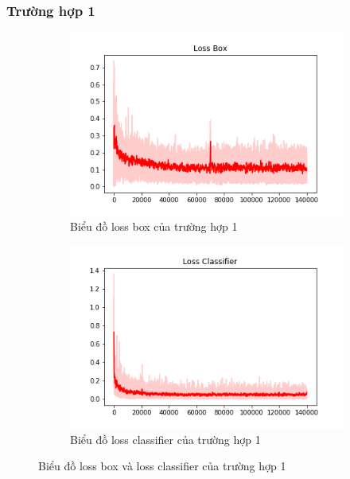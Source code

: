 \subsubsection{Trường hợp 1}
\begin{center}
    \begin{figure}[H]
    \centering
    	\begin{subfigure}[H]{0.5\linewidth}
    		\centering
    		\includegraphics[width=\linewidth]{images/chap3/loss_box_2.png}
		    \caption{Biểu đồ loss box của trường hợp 1}
		    \label{fig:my_label}
		\end{subfigure}\hfill
		\begin{subfigure}[H]{0.5\linewidth}
    		\centering
    		\includegraphics[width=\linewidth]{images/chap3/loss_cls_2.png}
		    \caption{Biểu đồ loss classifier của trường hợp 1}
		    \label{fig:my_label}
		\end{subfigure}\hfill
	\caption{Biểu đồ loss box và loss classifier của trường hợp 1}
    \label{fig:mylabel}
    \end{figure}


\end{center}

